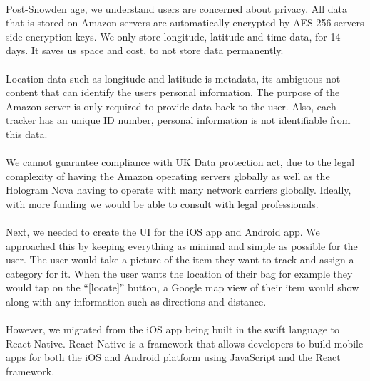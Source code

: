 \documentclass[12pt,a4paper]{article}
\begin{document}
        \paragraph{} Post-Snowden age, we understand users are concerned about privacy. All data that is stored on Amazon servers are automatically encrypted by AES-256 servers side encryption keys. We only store longitude, latitude and time data, for 14 days. It saves us space and cost, to not store data permanently.
        
        \paragraph{} Location data such as longitude and latitude is metadata, its ambiguous not content that can identify the users personal information. The purpose of the Amazon server is only required to provide data back to the user. Also, each tracker has an unique ID number, personal information is not identifiable from this data. 
        
        \paragraph{} We cannot guarantee compliance with UK Data protection act, due to the legal complexity of having the Amazon operating servers globally as well as the Hologram Nova having to operate with many network carriers globally. Ideally, with more funding we would be able to consult with legal professionals. 
        
        \paragraph{} Next, we needed to create the UI for the iOS app and Android app. We approached this by keeping everything as minimal and simple as possible for the user. The user would take a picture of the item they want to track and assign a category for it. When the user wants the location of their bag for example they would tap on the “[locate]” button, a Google map view of their item would show along with any information such as directions and distance. 
        
        \paragraph{} However, we migrated from the iOS app being built in the swift language to React Native. React Native is a framework that allows developers to build mobile apps for both the iOS and Android platform using JavaScript and the React framework. 
        
\end{document}
